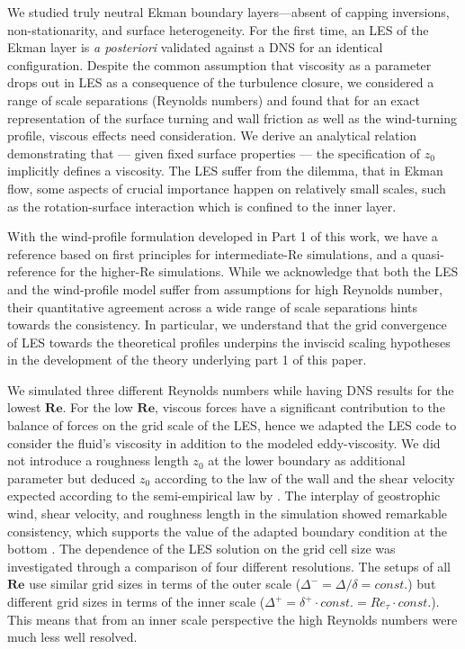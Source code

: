 \documentclass[draft,a4paper,11pt]{article}
\newcommand{\RE}{\mathbf{Re}}
\begin{document}
We studied truly neutral Ekman boundary layers---absent of capping inversions, non-stationarity, and surface heterogeneity. For the first time, an LES of the Ekman layer is \emph{a posteriori} validated against a DNS for an identical configuration. Despite the common assumption that viscosity as a parameter drops out in LES as a consequence of the turbulence closure, we considered a range of scale separations (Reynolds numbers) and found that for an exact representation of the surface turning and wall friction as well as the wind-turning profile, viscous effects need consideration. We derive an analytical relation demonstrating that --- given fixed surface properties --- the specification of $z_0$ implicitly defines a viscosity. The LES suffer from the dilemma, that in Ekman flow, some aspects of crucial importance happen on relatively small scales, such as the rotation-surface interaction which is confined to the inner layer.

With the wind-profile formulation developed in Part 1 of this work, we have a reference based on first principles for intermediate-Re simulations, and a quasi-reference for the higher-Re simulations. While we acknowledge that both the LES and the wind-profile model suffer from assumptions for high Reynolds number, their quantitative agreement across a wide range of scale separations hints towards the consistency. In particular, we understand that the grid convergence of LES towards the theoretical profiles underpins the inviscid scaling hypotheses in the development of the theory underlying part 1 of this paper.

We simulated three different Reynolds numbers while having DNS results for the lowest $\RE$. For the low $\RE$, viscous forces have a significant contribution to the balance of forces on the grid scale of the LES, hence we adapted the LES code to consider the fluid's viscosity in addition to the modeled eddy-viscosity. We did not introduce a roughness length $z_0$ at the lower boundary as additional parameter but deduced $z_0$ according to the law of the wall and the shear velocity expected according to the semi-empirical law by \cite{spalart1989theoretical}. The interplay of geostrophic wind, shear velocity, and roughness length in the simulation showed remarkable consistency, which supports the value of the adapted boundary condition at the bottom \citep{maronga2017formulation}. The dependence of the LES solution on the grid cell size was investigated through a comparison of four different resolutions. The setups of all $\RE$ use similar grid sizes in terms of the outer scale ($\Delta^-=\Delta/\delta=const.$) but different grid sizes in terms of the inner scale ($\Delta^+=\delta^+\cdot const. = Re_\tau\cdot const.$). This means that from an inner scale perspective the high Reynolds numbers were much less well resolved.
\end{document}
